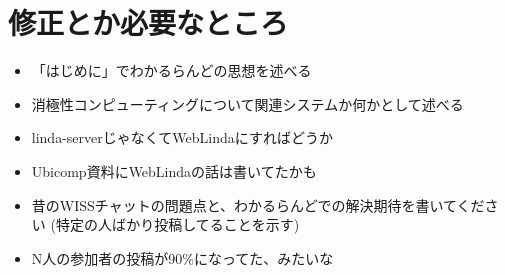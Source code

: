 \section*{修正とか必要なところ}

\begin{itemize}
  \item 「はじめに」でわかるらんどの思想を述べる
  \item 消極性コンピューティング\cite{kurihara2016}について関連システムか何かとして述べる
  \item linda-serverじゃなくてWebLindaにすればどうか
  \item Ubicomp資料\cite{shokai_furnitue}にWebLindaの話は書いてたかも
  \item 昔のWISSチャットの問題点と、わかるらんどでの解決期待を書いてください
    (特定の人ばかり投稿してることを示す)
  \item N人の参加者の投稿が90\%になってた、みたいな
\end{itemize}
